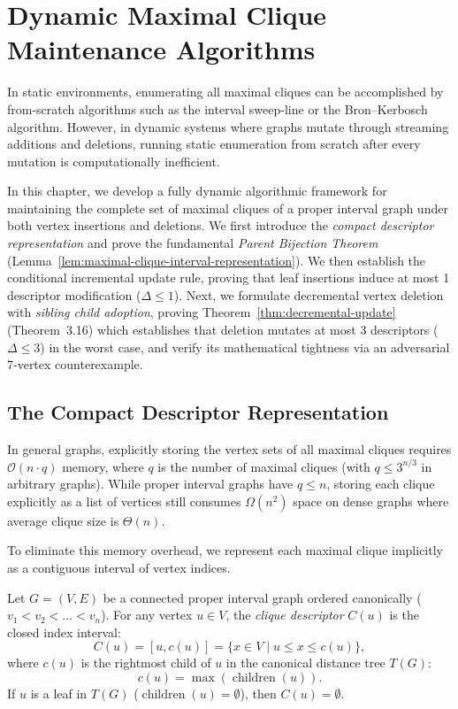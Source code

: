 \chapter{Dynamic Maximal Clique Maintenance Algorithms}
\label{chap:dynamic}

In static environments, enumerating all maximal cliques can be accomplished by from-scratch algorithms such as the interval sweep-line or the Bron--Kerbosch algorithm. However, in dynamic systems where graphs mutate through streaming additions and deletions, running static enumeration from scratch after every mutation is computationally inefficient.

In this chapter, we develop a fully dynamic algorithmic framework for maintaining the complete set of maximal cliques of a proper interval graph under both vertex insertions and deletions. We first introduce the \emph{compact descriptor representation} and prove the fundamental \emph{Parent Bijection Theorem} (Lemma~\ref{lem:maximal-clique-interval-representation}). We then establish the conditional incremental update rule, proving that leaf insertions induce at most 1 descriptor modification ($\Delta \le 1$). Next, we formulate decremental vertex deletion with \emph{sibling child adoption}, proving Theorem~\ref{thm:decremental-update} (Theorem~3.16) which establishes that deletion mutates at most 3 descriptors ($\Delta \le 3$) in the worst case, and verify its mathematical tightness via an adversarial 7-vertex counterexample.

\section{The Compact Descriptor Representation}
\label{sec:dynamic_descriptors}

In general graphs, explicitly storing the vertex sets of all maximal cliques requires $\mathcal{O}(n \cdot q)$ memory, where $q$ is the number of maximal cliques (with $q \le 3^{n/3}$ in arbitrary graphs). While proper interval graphs have $q \le n$, storing each clique explicitly as a list of vertices still consumes $\Omega(n^2)$ space on dense graphs where average clique size is $\Theta(n)$.

To eliminate this memory overhead, we represent each maximal clique implicitly as a contiguous interval of vertex indices.

\begin{definition}
Let $G = (V, E)$ be a connected proper interval graph ordered canonically ($v_1 < v_2 < \dots < v_n$). For any vertex $u \in V$, the \emph{clique descriptor} $C(u)$ is the closed index interval:
\begin{equation}
    C(u) = [u, c(u)] = \{ x \in V \mid u \le x \le c(u) \},
\end{equation}
where $c(u)$ is the rightmost child of $u$ in the canonical distance tree $T(G)$:
\begin{equation}
    c(u) = \max \left( \operatorname{children}(u) \right).
\end{equation}
If $u$ is a leaf in $T(G)$ ($\operatorname{children}(u) = \emptyset$), then $C(u) = \emptyset$.
\end{definition}

